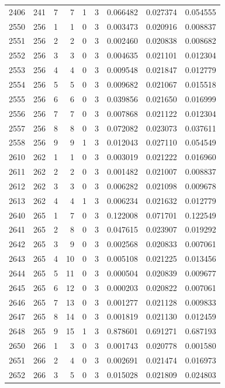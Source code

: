 \begin{longtable}{rrrrrrrrr}
2406 & 241 & 7 & 7 & 1 & 3 & 0.066482 & 0.027374 & 0.054555 \\
2550 & 256 & 1 & 1 & 0 & 3 & 0.003473 & 0.020916 & 0.008837 \\
2551 & 256 & 2 & 2 & 0 & 3 & 0.002460 & 0.020838 & 0.008682 \\
2552 & 256 & 3 & 3 & 0 & 3 & 0.004635 & 0.021101 & 0.012304 \\
2553 & 256 & 4 & 4 & 0 & 3 & 0.009548 & 0.021847 & 0.012779 \\
2554 & 256 & 5 & 5 & 0 & 3 & 0.009682 & 0.021067 & 0.015518 \\
2555 & 256 & 6 & 6 & 0 & 3 & 0.039856 & 0.021650 & 0.016999 \\
2556 & 256 & 7 & 7 & 0 & 3 & 0.007868 & 0.021122 & 0.012304 \\
2557 & 256 & 8 & 8 & 0 & 3 & 0.072082 & 0.023073 & 0.037611 \\
2558 & 256 & 9 & 9 & 1 & 3 & 0.012043 & 0.027110 & 0.054549 \\
2610 & 262 & 1 & 1 & 0 & 3 & 0.003019 & 0.021222 & 0.016960 \\
2611 & 262 & 2 & 2 & 0 & 3 & 0.001482 & 0.021007 & 0.008837 \\
2612 & 262 & 3 & 3 & 0 & 3 & 0.006282 & 0.021098 & 0.009678 \\
2613 & 262 & 4 & 4 & 1 & 3 & 0.006234 & 0.021632 & 0.012779 \\
2640 & 265 & 1 & 7 & 0 & 3 & 0.122008 & 0.071701 & 0.122549 \\
2641 & 265 & 2 & 8 & 0 & 3 & 0.047615 & 0.023907 & 0.019292 \\
2642 & 265 & 3 & 9 & 0 & 3 & 0.002568 & 0.020833 & 0.007061 \\
2643 & 265 & 4 & 10 & 0 & 3 & 0.005108 & 0.021225 & 0.013456 \\
2644 & 265 & 5 & 11 & 0 & 3 & 0.000504 & 0.020839 & 0.009677 \\
2645 & 265 & 6 & 12 & 0 & 3 & 0.000203 & 0.020822 & 0.007061 \\
2646 & 265 & 7 & 13 & 0 & 3 & 0.001277 & 0.021128 & 0.009833 \\
2647 & 265 & 8 & 14 & 0 & 3 & 0.001819 & 0.021130 & 0.012459 \\
2648 & 265 & 9 & 15 & 1 & 3 & 0.878601 & 0.691271 & 0.687193 \\
2650 & 266 & 1 & 3 & 0 & 3 & 0.001743 & 0.020778 & 0.001580 \\
2651 & 266 & 2 & 4 & 0 & 3 & 0.002691 & 0.021474 & 0.016973 \\
2652 & 266 & 3 & 5 & 0 & 3 & 0.015028 & 0.021809 & 0.024803 \\

\end{longtable}
